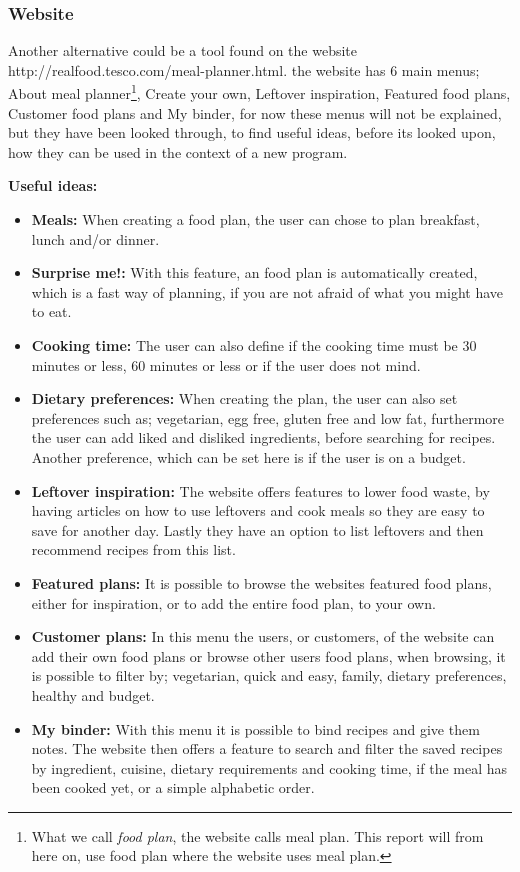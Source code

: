 \subsubsection{Website}
Another alternative could be a tool found on the website http://realfood.tesco.com/meal-planner.html\cite{tesco_foodplan}. the website has 6 main menus; About meal planner\footnote{What we call \textit{food plan}, the website calls meal plan. This report will from here on, use food plan where the website uses meal plan.}, Create your own, Leftover inspiration, Featured food plans, Customer food plans and My binder, for now these menus will not be explained, but they have been looked through, to find useful ideas, before its looked upon, how they can be used in the context of a new program.

\textbf{Useful ideas:}
\begin{itemize}
  \item \textbf{Meals:} When creating a food plan, the user can chose to plan breakfast, lunch and/or dinner.
  \item \textbf{Surprise me!:} With this feature, an food plan is automatically created, which is a fast way of planning, if you are not afraid of what you might have to eat.
  \item \textbf{Cooking time:} The user can also define if the cooking time must be 30 minutes or less, 60 minutes or less or if the user does not mind.
  \item \textbf{Dietary preferences:} When creating the plan, the user can also set preferences such as; vegetarian, egg free, gluten free and low fat, furthermore the user can add liked and disliked ingredients, before searching for recipes. Another preference, which can be set here is if the user is on a budget.
  \item \textbf{Leftover inspiration:} The website offers features to lower food waste, by having articles on how to use leftovers and cook meals so they are easy to save for another day. Lastly they have an option to list leftovers and then recommend recipes from this list.
  \item \textbf{Featured plans:} It is possible to browse the websites featured food plans, either for inspiration, or to add the entire food plan, to your own.
  \item \textbf{Customer plans:} In this menu the users, or customers, of the website can add their own food plans or browse other users food plans, when browsing, it is possible to filter by; vegetarian, quick and easy, family, dietary preferences, healthy and budget.
  \item \textbf{My binder:} With this menu it is possible to bind recipes and give them notes. The website then offers a feature to search and filter the saved recipes  by ingredient, cuisine, dietary requirements and cooking time, if the meal has been cooked yet, or a simple alphabetic order.
\end{itemize}

